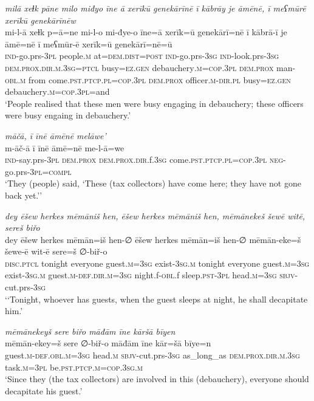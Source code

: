 \ea \label{BP.45}
\textit{milā xeɫk pāne milo miđyo īne ā xerīkū genekārīnē ī kābrāy je āmēnē, ī meʕmūrē xerīkū genekārīnēw} \\ 
\gll mi-l-ā xeɫk p=ā=ne mi-l-o mi-đye-o īne=ā xerīk=ū genekārī=nē ī kābrā-ī je āmē=nē ī meʕmūr-ē xerīk=ū genekārī=nē=ū \\ 
 \textsc{ind-}go.prs\textsc{-3pl} people\textsc{.m} at=\textsc{dem.dist}\textsc{=\textsc{post}} \textsc{ind-}go.prs\textsc{-3sg} \textsc{ind-}look.prs\textsc{-3sg} \textsc{dem.prox}\textsc{.dir}\textsc{.m}\textsc{.3sg}=\textsc{ptcl} busy\textsc{=ez.gen} debauchery\textsc{.m}\textsc{=cop}\textsc{.3pl} \textsc{dem.prox} man\textsc{-obl}\textsc{.m} from come\textsc{.pst}\textsc{.ptcp}\textsc{.pl}\textsc{=cop}\textsc{.3pl} \textsc{dem.prox} officer\textsc{.m}\textsc{-dir}\textsc{.pl} busy\textsc{=ez.gen} debauchery\textsc{.m}\textsc{=cop}\textsc{.3pl}=and \\ 
\glt `People realised that these men were busy engaging in debauchery; these officers were busy engaing in debauchery.'
\z 
 
\ea \label{BP.47}
\textit{māčā, ī īnē āmēnē melāwe’} \\ 
\gll m-āč-ā ī īnē āmē=nē me-l-ā=we \\ 
 \textsc{ind-}say.prs\textsc{-3pl} \textsc{dem.prox} \textsc{dem.prox}\textsc{.dir}.f\textsc{.3sg} come\textsc{.pst}\textsc{.ptcp}\textsc{.pl}\textsc{=cop}\textsc{.3pl} \textsc{neg-}go.prs\textsc{-3pl}\textsc{=compl} \\ 
\glt `They (people) said, ‘These (tax collectors) have come here; they have not gone back yet.’'
\z 
 
\ea \label{BP.52}
\textit{dey ēšew herkes mēmāniš hen, ēšew herkes mēmāniš hen, mēmānekeš šewē witē, sereš biřo} \\ 
\gll dey ēšew herkes mēmān=iš hen-∅ ēšew herkes mēmān=iš hen-∅ mēmān-eke=š šewe-ē wit-ē sere=š ∅-biř-o \\ 
 \textsc{disc.ptcl} tonight everyone guest\textsc{.m}\textsc{=3sg} exist\textsc{-3sg}\textsc{.m} tonight everyone guest\textsc{.m}\textsc{=3sg} exist\textsc{-3sg}\textsc{.m} guest\textsc{.m}\textsc{-def}\textsc{.dir}\textsc{.m}\textsc{=3sg} night.f\textsc{-obl}.f sleep\textsc{.pst}\textsc{-3pl} head\textsc{.m}\textsc{=3sg} \textsc{sbjv-}cut.prs\textsc{-3sg} \\ 
\glt `‘Tonight, whoever has guests, when the guest sleeps at night, he shall decapitate him.'
\z 
 
\ea \label{BP.53}
\textit{mēmānekeyš sere biřo māđām īne kāršā bīyen} \\ 
\gll mēmān-ekey=š sere ∅-biř-o māđām īne kār=šā bīye=n \\ 
 guest\textsc{.m}\textsc{-def}\textsc{.obl}\textsc{.m}\textsc{=3sg} head\textsc{.m} \textsc{sbjv-}cut.prs\textsc{-3sg} as\_long\_as \textsc{dem.prox}\textsc{.dir}\textsc{.m}\textsc{.3sg} task\textsc{.m}\textsc{=3pl} be\textsc{.pst}\textsc{.ptcp}\textsc{.m}\textsc{=cop}\textsc{.3sg}\textsc{.m} \\ 
\glt `Since they (the tax collectors) are involved in this (debauchery), everyone should decapitate his guest.'
\z 
 
